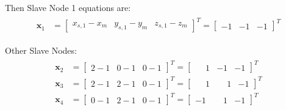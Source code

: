 \documentclass[10pt,b5paper,titlepage]{book}
\newcommand{\m}{\mathbf}
\newenvironment{eqarray}
{
    \begin{eqnarray}
        \begin{aligned}
}
{
        \end{aligned}
    \end{eqnarray}
}
\begin{document}
Then Slave Node 1 equations are:
\begin{eqarray}
    \m{x}_1 &=
    \begin{bmatrix}
        x_{s,1} - x_m & y_{s,1} - y_m & z_{s,1} - z_m
    \end{bmatrix}^T =
    \begin{bmatrix}
        -1 & -1 & -1
    \end{bmatrix}^T
\end{eqarray}

Other Slave Nodes:
\begin{eqarray}
    \m{x}_2 &=
    \begin{bmatrix}
        2 - 1 & 0 - 1 & 0 - 1
    \end{bmatrix}^T =
    \begin{bmatrix}
        \phantom{-}1 & -1 & -1
    \end{bmatrix}^T \\
    \m{x}_3 &=
    \begin{bmatrix}
        2 - 1 & 2 - 1 & 0 - 1
    \end{bmatrix}^T =
    \begin{bmatrix}
        \phantom{-}1 & \phantom{-}1 & -1
    \end{bmatrix}^T \\
    \m{x}_4 &=
    \begin{bmatrix}
        0 - 1 & 2 - 1 & 0 - 1
    \end{bmatrix}^T =
    \begin{bmatrix}
        -1 & \phantom{-}1 & -1
    \end{bmatrix}^T
\end{eqarray}
\end{document}
